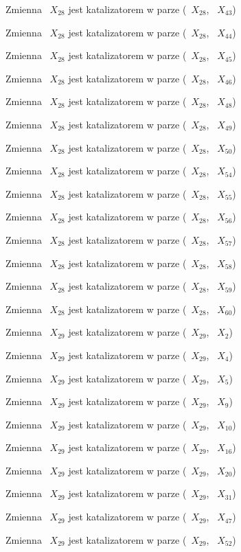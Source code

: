 \documentclass{article}
\begin{document}
Zmienna ~$X_{28}$ jest katalizatorem w parze (~$X_{28}$, ~$X_{43}$)

Zmienna ~$X_{28}$ jest katalizatorem w parze (~$X_{28}$, ~$X_{44}$)

Zmienna ~$X_{28}$ jest katalizatorem w parze (~$X_{28}$, ~$X_{45}$)

Zmienna ~$X_{28}$ jest katalizatorem w parze (~$X_{28}$, ~$X_{46}$)

Zmienna ~$X_{28}$ jest katalizatorem w parze (~$X_{28}$, ~$X_{48}$)

Zmienna ~$X_{28}$ jest katalizatorem w parze (~$X_{28}$, ~$X_{49}$)

Zmienna ~$X_{28}$ jest katalizatorem w parze (~$X_{28}$, ~$X_{50}$)

Zmienna ~$X_{28}$ jest katalizatorem w parze (~$X_{28}$, ~$X_{54}$)

Zmienna ~$X_{28}$ jest katalizatorem w parze (~$X_{28}$, ~$X_{55}$)

Zmienna ~$X_{28}$ jest katalizatorem w parze (~$X_{28}$, ~$X_{56}$)

Zmienna ~$X_{28}$ jest katalizatorem w parze (~$X_{28}$, ~$X_{57}$)

Zmienna ~$X_{28}$ jest katalizatorem w parze (~$X_{28}$, ~$X_{58}$)

Zmienna ~$X_{28}$ jest katalizatorem w parze (~$X_{28}$, ~$X_{59}$)

Zmienna ~$X_{28}$ jest katalizatorem w parze (~$X_{28}$, ~$X_{60}$)

Zmienna ~$X_{29}$ jest katalizatorem w parze (~$X_{29}$, ~$X_{2}$)

Zmienna ~$X_{29}$ jest katalizatorem w parze (~$X_{29}$, ~$X_{4}$)

Zmienna ~$X_{29}$ jest katalizatorem w parze (~$X_{29}$, ~$X_{5}$)

Zmienna ~$X_{29}$ jest katalizatorem w parze (~$X_{29}$, ~$X_{9}$)

Zmienna ~$X_{29}$ jest katalizatorem w parze (~$X_{29}$, ~$X_{10}$)

Zmienna ~$X_{29}$ jest katalizatorem w parze (~$X_{29}$, ~$X_{16}$)

Zmienna ~$X_{29}$ jest katalizatorem w parze (~$X_{29}$, ~$X_{20}$)

Zmienna ~$X_{29}$ jest katalizatorem w parze (~$X_{29}$, ~$X_{31}$)

Zmienna ~$X_{29}$ jest katalizatorem w parze (~$X_{29}$, ~$X_{47}$)

Zmienna ~$X_{29}$ jest katalizatorem w parze (~$X_{29}$, ~$X_{52}$)
\end{document}
